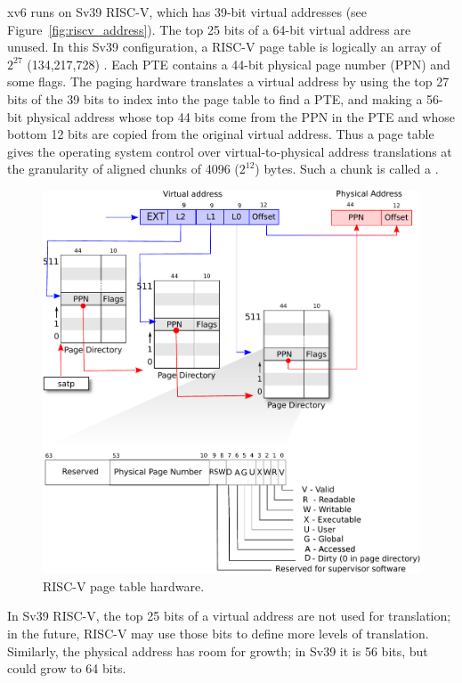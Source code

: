 xv6 runs on Sv39 RISC-V, which has 39-bit virtual
addresses (see Figure~\ref{fig:riscv_address}). The top 25 bits of a
64-bit virtual address are unused.  In this Sv39 configuration, a
RISC-V page table is logically an array of $2^{27}$ (134,217,728)
.  Each PTE contains a 44-bit
physical page number (PPN) and some flags. The paging hardware
translates a virtual address by using the top 27 bits of the 39 bits
to index into the page table to find a PTE, and making a 56-bit
physical address whose top 44 bits come from the PPN in the PTE
and whose bottom 12 bits are copied from the original virtual address.
Thus a page table
gives the operating system control over virtual-to-physical address
translations at the granularity of aligned chunks of 4096 ($2^{12}$)
bytes.  Such a chunk is called a .

\begin{figure}[t]
\center
\includegraphics[scale=0.5]{fig/riscv_pagetable.pdf}
\caption{RISC-V page table hardware.}
\label{fig:riscv_pagetable}
\end{figure}

In Sv39 RISC-V, the top 25 bits of a virtual address are not
used for translation; in the future, RISC-V may use those bits to
define more levels of translation.  Similarly, the physical address
has room for growth; in Sv39 it is 56 bits, but could grow to 64 bits.

